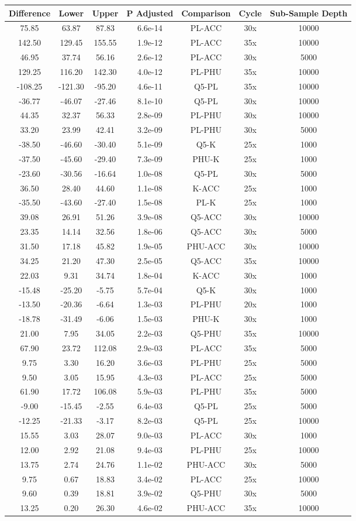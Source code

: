 \documentclass[12pt,]{article}
\begin{document}
\begin{longtable}[]{@{}ccccccc@{}}
\toprule
Difference & Lower & Upper & P Adjusted & Comparison & Cycle &
Sub-Sample Depth\tabularnewline
\midrule
\endhead
75.85 & 63.87 & 87.83 & 6.6e-14 & PL-ACC & 30x & 10000\tabularnewline
142.50 & 129.45 & 155.55 & 1.9e-12 & PL-ACC & 35x & 10000\tabularnewline
46.95 & 37.74 & 56.16 & 2.6e-12 & PL-ACC & 30x & 5000\tabularnewline
129.25 & 116.20 & 142.30 & 4.0e-12 & PL-PHU & 35x & 10000\tabularnewline
-108.25 & -121.30 & -95.20 & 4.6e-11 & Q5-PL & 35x &
10000\tabularnewline
-36.77 & -46.07 & -27.46 & 8.1e-10 & Q5-PL & 30x & 10000\tabularnewline
44.35 & 32.37 & 56.33 & 2.8e-09 & PL-PHU & 30x & 10000\tabularnewline
33.20 & 23.99 & 42.41 & 3.2e-09 & PL-PHU & 30x & 5000\tabularnewline
-38.50 & -46.60 & -30.40 & 5.1e-09 & Q5-K & 25x & 1000\tabularnewline
-37.50 & -45.60 & -29.40 & 7.3e-09 & PHU-K & 25x & 1000\tabularnewline
-23.60 & -30.56 & -16.64 & 1.0e-08 & Q5-PL & 30x & 5000\tabularnewline
36.50 & 28.40 & 44.60 & 1.1e-08 & K-ACC & 25x & 1000\tabularnewline
-35.50 & -43.60 & -27.40 & 1.5e-08 & PL-K & 25x & 1000\tabularnewline
39.08 & 26.91 & 51.26 & 3.9e-08 & Q5-ACC & 30x & 10000\tabularnewline
23.35 & 14.14 & 32.56 & 1.8e-06 & Q5-ACC & 30x & 5000\tabularnewline
31.50 & 17.18 & 45.82 & 1.9e-05 & PHU-ACC & 30x & 10000\tabularnewline
34.25 & 21.20 & 47.30 & 2.5e-05 & Q5-ACC & 35x & 10000\tabularnewline
22.03 & 9.31 & 34.74 & 1.8e-04 & K-ACC & 30x & 1000\tabularnewline
-15.48 & -25.20 & -5.75 & 5.7e-04 & Q5-K & 30x & 1000\tabularnewline
-13.50 & -20.36 & -6.64 & 1.3e-03 & PL-PHU & 20x & 1000\tabularnewline
-18.78 & -31.49 & -6.06 & 1.5e-03 & PHU-K & 30x & 1000\tabularnewline
21.00 & 7.95 & 34.05 & 2.2e-03 & Q5-PHU & 35x & 10000\tabularnewline
67.90 & 23.72 & 112.08 & 2.9e-03 & PL-ACC & 35x & 5000\tabularnewline
9.75 & 3.30 & 16.20 & 3.6e-03 & PL-PHU & 25x & 5000\tabularnewline
9.50 & 3.05 & 15.95 & 4.3e-03 & PL-ACC & 25x & 5000\tabularnewline
61.90 & 17.72 & 106.08 & 5.9e-03 & PL-PHU & 35x & 5000\tabularnewline
-9.00 & -15.45 & -2.55 & 6.4e-03 & Q5-PL & 25x & 5000\tabularnewline
-12.25 & -21.33 & -3.17 & 8.2e-03 & Q5-PL & 25x & 10000\tabularnewline
15.55 & 3.03 & 28.07 & 9.0e-03 & PL-ACC & 30x & 1000\tabularnewline
12.00 & 2.92 & 21.08 & 9.4e-03 & PL-PHU & 25x & 10000\tabularnewline
13.75 & 2.74 & 24.76 & 1.1e-02 & PHU-ACC & 30x & 5000\tabularnewline
9.75 & 0.67 & 18.83 & 3.4e-02 & PL-ACC & 25x & 10000\tabularnewline
9.60 & 0.39 & 18.81 & 3.9e-02 & Q5-PHU & 30x & 5000\tabularnewline
13.25 & 0.20 & 26.30 & 4.6e-02 & PHU-ACC & 35x & 10000\tabularnewline
\bottomrule
\end{longtable}
\end{document}
